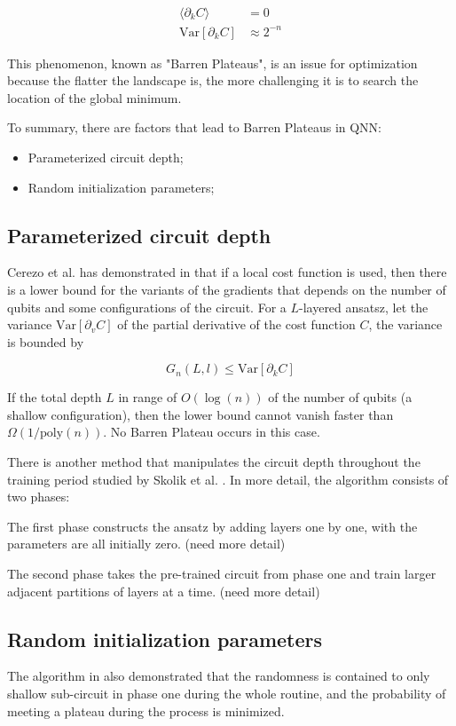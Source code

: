 \begin{align}
    \langle \partial_k C\rangle &= 0  \label{Vanish Gradient}\\
    \mathrm{Var}[\partial_k C] &\approx 2^{-n}  \label{Variance expo smaller}
\end{align}

This phenomenon, known as "Barren Plateaus", is an issue for optimization because the flatter the landscape is, the more challenging it is to search the location of the global minimum.

To summary, there are factors that lead to Barren Plateaus in QNN:
\begin{itemize}
    \item Parameterized circuit depth;
    \item Random initialization parameters;
\end{itemize}

\subsection{Parameterized circuit depth}


Cerezo et al. has demonstrated in \cite{cerezoCostFunctionDependent2021} that if a local cost function is used, then there is a lower bound for the variants of the gradients that depends on the number of qubits and some configurations of the circuit. 
For a $L$-layered ansatsz, let the variance $\mathrm{Var}[\partial_v C]$ of the partial derivative of the cost function $C$, the variance is bounded by

\begin{equation}
    G_n(L,l) \leq \mathrm{Var}[\partial_k C]
\end{equation}

If the total depth $L$ in range of $O(\log(n))$ of the number of qubits (a shallow configuration), then the lower bound cannot vanish faster than $\Omega(1/\mathrm{poly}(n))$. No Barren Plateau occurs in this case.

There is another method that manipulates the circuit depth throughout the training period studied by Skolik et al. \cite{skolikLayerwiseLearningQuantum2021}. 
In more detail, the algorithm consists of two phases:

The first phase constructs the ansatz by adding layers one by one, with the parameters are all initially zero. (need more detail)

The second phase takes the pre-trained circuit from phase one and train larger adjacent partitions of layers at a time. (need more detail)

\subsection{Random initialization parameters}

The algorithm in \cite{skolikLayerwiseLearningQuantum2021} also demonstrated that the randomness is contained to only shallow sub-circuit in phase one during the whole routine, and the probability of meeting a plateau during the process is minimized.